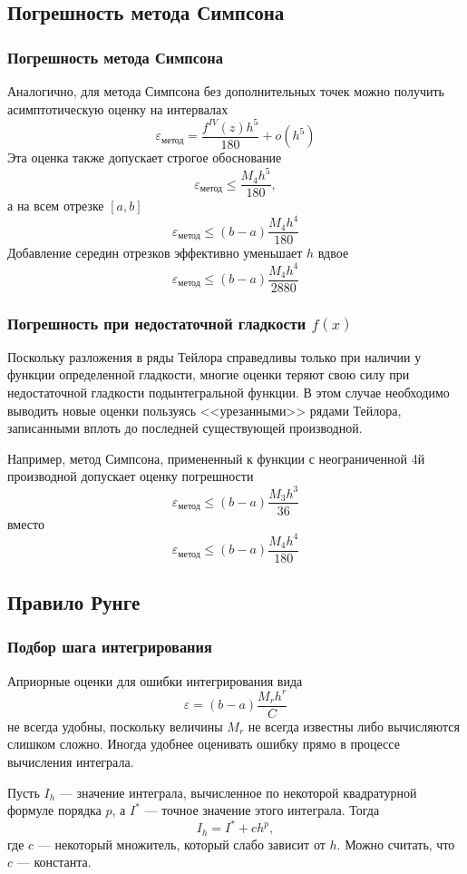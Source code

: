 \documentclass[aspectratio=169,unicode]{beamer}
\begin{document}
\subsection{Погрешность метода Симпсона}
\begin{frame}
\frametitle{Погрешность метода Симпсона}
	Аналогично, для метода Симпсона без дополнительных точек можно получить
	асимптотическую оценку на интервалах
	\[
	\varepsilon_{\text{метод}} = \frac{f^{IV}(z) h^5}{180} + o(h^5)
	\]
	Эта оценка также допускает строгое обоснование
	\[
	\varepsilon_{\text{метод}} \leq \frac{M_4 h^5}{180},
	\]
	а на всем отрезке $[a,b]$
	\[
	\varepsilon_{\text{метод}} \leq (b-a)\frac{M_4 h^4}{180}
	\]
	Добавление середин отрезков эффективно уменьшает $h$ вдвое
	\[
	\varepsilon_{\text{метод}} \leq (b-a)\frac{M_4 h^4}{2880}
	\]
\end{frame}

\begin{frame}
\frametitle{Погрешность при недостаточной гладкости $f(x)$}
	Поскольку разложения в ряды Тейлора справедливы только
	при наличии у функции определенной гладкости,
	многие оценки теряют свою силу при недостаточной гладкости
	подынтегральной функции. В этом случае необходимо выводить новые оценки пользуясь
	<<урезанными>> рядами Тейлора, записанными вплоть до последней существующей производной.

	Например, метод Симпсона, примененный к функции с неограниченной 4й производной допускает оценку погрешности
	\[
	\varepsilon_{\text{метод}} \leq (b-a)\frac{M_3 h^3}{36}
	\]
	вместо
	\[
	\varepsilon_{\text{метод}} \leq (b-a)\frac{M_4 h^4}{180}
	\]
\end{frame}

\subsection{Правило Рунге}
\begin{frame}
\frametitle{Подбор шага интегрирования}
	Априорные оценки для ошибки интегрирования вида
	\[
		\varepsilon = (b-a)\frac{M_r h^r}{C}
	\]
	не всегда удобны, поскольку величины $M_r$ не всегда известны либо вычисляются
	слишком сложно. Иногда удобнее оценивать ошибку прямо в процессе вычисления интеграла.

	Пусть $I_h$ --- значение интеграла, вычисленное по некоторой квадратурной
	формуле порядка $p$, а $I^*$ --- точное значение этого интеграла. Тогда
	\[
		I_h = I^* + c h^p,
	\]
	где $c$ --- некоторый множитель, который слабо зависит от $h$. Можно считать,
	что $c$ --- константа.
\end{frame}
\end{document}
